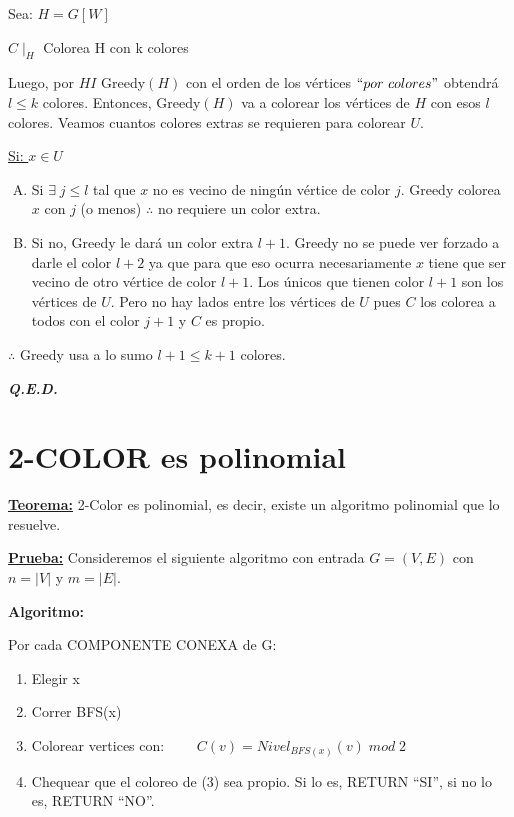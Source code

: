 \documentclass[12pt,a4paper]{report}
\providecommand{\abs}[1]{\lvert#1\rvert}
\newcommand{\QED}{\hfill \textit{\textbf{Q.E.D.}}}
\begin{document}
        \vspace{3mm}
        Sea: $H = G\left[W\right]$
        \vspace{3mm}

        $C\mid_{H}$ Colorea H con k colores

        \vspace{3mm}
        Luego, por $HI$ Greedy$(H)$ con el orden de los vértices $``por\ colores"$ obtendrá $l \leq k$ colores.
        Entonces, Greedy$(H)$ va a colorear los vértices de $H$ con esos $l$ colores. Veamos cuantos colores extras se
        requieren para colorear $U$.

        \vspace{3mm}
        \underline{Si: $x \in U$}
        \begin{enumerate}[A)]
          \item Si $\exists\; j \leq l $ tal que $x$ no es vecino de ningún vértice de color $j$. Greedy colorea $x$ con
                $j$ (o menos) $\therefore$ no requiere un color extra.
          \item Si no, Greedy le dará un color extra $l+1$. Greedy no se puede ver forzado a darle el color $l+2$ ya que
                para que eso ocurra necesariamente $x$ tiene que ser vecino de otro vértice de color $l+1$. Los únicos que
                tienen color $l+1$ son los vértices de $U$. Pero no hay lados entre los vértices de $U$ pues $C$ los
                colorea a todos con el color $j+1$ y $C$ es propio.
        \end{enumerate}
        $\therefore$ Greedy usa a lo sumo $l + 1 \leq k + 1$ colores.

        \QED

  	\section{2-COLOR es polinomial}
  		\textbf{\underline{Teorema:}} 2-Color es polinomial, es decir, existe un algoritmo polinomial que lo resuelve.

  		\textbf{\underline{Prueba:}} Consideremos el siguiente algoritmo con entrada $G = (V, E)$ con $n = \abs{V}$ y $m = \abs{E}$.

  			\vspace{5mm}
  			\par \textbf{Algoritmo:}
  			\par Por cada COMPONENTE CONEXA de G:
  				\begin{enumerate}
  					\item Elegir x
  					\item Correr BFS(x)
  					\item Colorear vertices con: $\qquad	C(v) = Nivel_{BFS(x)}(v) \; mod \; 2$
  					\item Chequear que el coloreo de (3) sea propio. Si lo es, RETURN \textquotedblleft SI\textquotedblright, si no lo es, RETURN \textquotedblleft NO\textquotedblright.
  				\end{enumerate}
\end{document}
